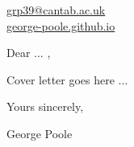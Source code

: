 \documentclass[12pt]{article}
\begin{document}
\begin{flushright}
\href{grp39@cantab.ac.uk}{grp39@cantab.ac.uk} \\
\href{https://george-poole.github.io/home.html}{george-poole.github.io} \\
\end{flushright}

\vspace{20pt}

Dear ... ,
\vspace{10pt}

Cover letter goes here ...

\vspace{10pt}
Yours sincerely,

George Poole
\end{document}
